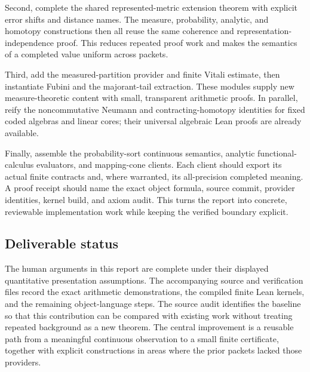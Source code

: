 Second, complete the shared represented-metric extension theorem with explicit error shifts and distance names. The measure, probability, analytic, and homotopy constructions then all reuse the same coherence and representation-independence proof. This reduces repeated proof work and makes the semantics of a completed value uniform across packets.

Third, add the measured-partition provider and finite Vitali estimate, then instantiate Fubini and the majorant-tail extraction. These modules supply new measure-theoretic content with small, transparent arithmetic proofs. In parallel, reify the noncommutative Neumann and contracting-homotopy identities for fixed coded algebras and linear cores; their universal algebraic Lean proofs are already available.

Finally, assemble the probability-sort continuous semantics, analytic functional-calculus evaluators, and mapping-cone clients. Each client should export its actual finite contracts and, where warranted, its all-precision completed meaning. A proof receipt should name the exact object formula, source commit, provider identities, kernel build, and axiom audit. This turns the report into concrete, reviewable implementation work while keeping the verified boundary explicit.

\subsection{Deliverable status}

The human arguments in this report are complete under their displayed quantitative presentation assumptions. The accompanying source and verification files record the exact arithmetic demonstrations, the compiled finite Lean kernels, and the remaining object-language steps. The source audit identifies the baseline so that this contribution can be compared with existing work without treating repeated background as a new theorem. The central improvement is a reusable path from a meaningful continuous observation to a small finite certificate, together with explicit constructions in areas where the prior packets lacked those providers.
